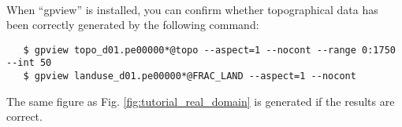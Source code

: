 \vspace{1cm}
 \hrulefill \\
When ``gpview'' is installed, you can confirm whether topographical data
has been correctly generated by the following command:
 \begin{verbatim}
   $ gpview topo_d01.pe00000*@topo --aspect=1 --nocont --range 0:1750 --int 50
   $ gpview landuse_d01.pe00000*@FRAC_LAND --aspect=1 --nocont
 \end{verbatim}
The same figure as Fig. \ref{fig:tutorial_real_domain} is generated
if the results are correct.

